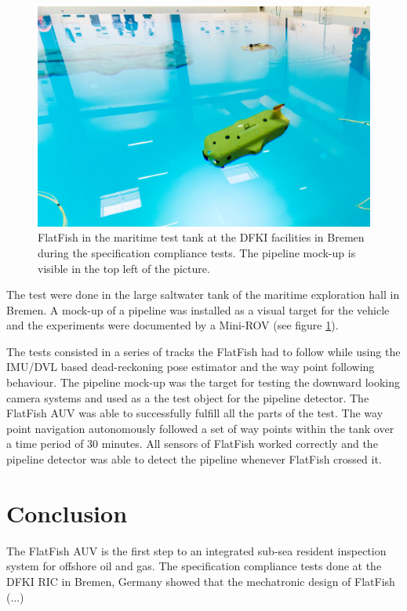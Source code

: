\documentclass[conference]{IEEEtran}
\begin{document}
\begin{figure}[!t]
	\centering
	\includegraphics[width=0.9\columnwidth]{FlatFish-2.jpg}
	\caption{FlatFish in the maritime test tank at the DFKI facilities in Bremen during the specification compliance tests. The pipeline mock-up is visible in the top left of the picture.}
	\label{fig:flatfish2}
\end{figure}

The test were done in the large saltwater tank of the maritime exploration hall in Bremen. A mock-up of a pipeline was installed as a visual target for the vehicle and the experiments were documented by a Mini-ROV (see figure \ref{fig:flatfish2}). 

The tests consisted in a series of tracks the FlatFish had to follow while using the IMU/DVL based dead-reckoning pose estimator and the way point following behaviour. The pipeline mock-up was the target for testing the downward looking camera systems and used as a the test object for the pipeline detector. The FlatFish AUV was able to successfully fulfill all the parts of the test. The way point navigation autonomously followed a set of way points within the tank over a time period of 30 minutes. All sensors of FlatFish worked correctly and the pipeline detector was able to detect the pipeline whenever FlatFish crossed it. 

\section{Conclusion}

The FlatFish AUV is the first step to an integrated sub-sea resident inspection system for offshore oil and gas. The specification compliance tests done at the DFKI RIC in Bremen, Germany showed that the mechatronic design of FlatFish (...)
\end{document}
